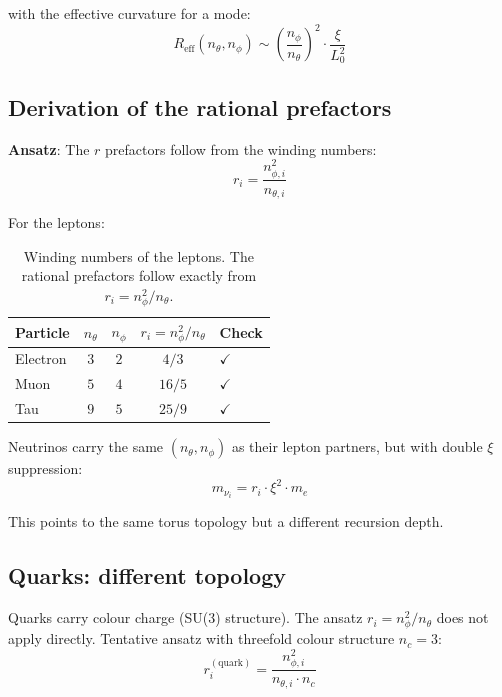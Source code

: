 with the effective curvature for a mode:
\begin{equation}
    R_{\mathrm{eff}}(n_\theta, n_\phi)
    \sim \left(\frac{n_\phi}{n_\theta}\right)^2 \cdot \frac{\xi}{L_0^2}
\end{equation}

\subsection{Derivation of the rational prefactors}

\textbf{Ansatz}: The $r$ prefactors follow from the winding numbers:
\begin{equation}
    \boxed{r_i = \frac{n_{\phi,i}^2}{n_{\theta,i}}}
    \label{eq:r_winding}
\end{equation}

For the leptons:

\begin{table}[htbp]
\centering
\begin{tabular}{lcccl}
\toprule
\textbf{Particle} & $n_\theta$ & $n_\phi$ & $r_i = n_\phi^2/n_\theta$
& \textbf{Check} \\
\midrule
Electron & $3$ & $2$ & $4/3$  & $\checkmark$ \\
Muon     & $5$ & $4$ & $16/5$ & $\checkmark$ \\
Tau      & $9$ & $5$ & $25/9$ & $\checkmark$ \\
\bottomrule
\end{tabular}
\caption{Winding numbers of the leptons. The rational prefactors follow
exactly from $r_i = n_\phi^2 / n_\theta$.}
\label{tab:lepton_winding}
\end{table}

Neutrinos carry the same $(n_\theta, n_\phi)$ as their lepton partners,
but with double $\xi$ suppression:
\begin{equation}
    m_{\nu_i} = r_i \cdot \xi^2 \cdot m_e
\end{equation}

This points to the same torus topology but a different recursion depth.

\subsection{Quarks: different topology}

Quarks carry colour charge (SU(3) structure). The ansatz
$r_i = n_\phi^2 / n_\theta$ does not apply directly. Tentative
ansatz with threefold colour structure $n_c = 3$:
\begin{equation}
    r_i^{(\mathrm{quark})} = \frac{n_{\phi,i}^2}{n_{\theta,i} \cdot n_c}
\end{equation}

